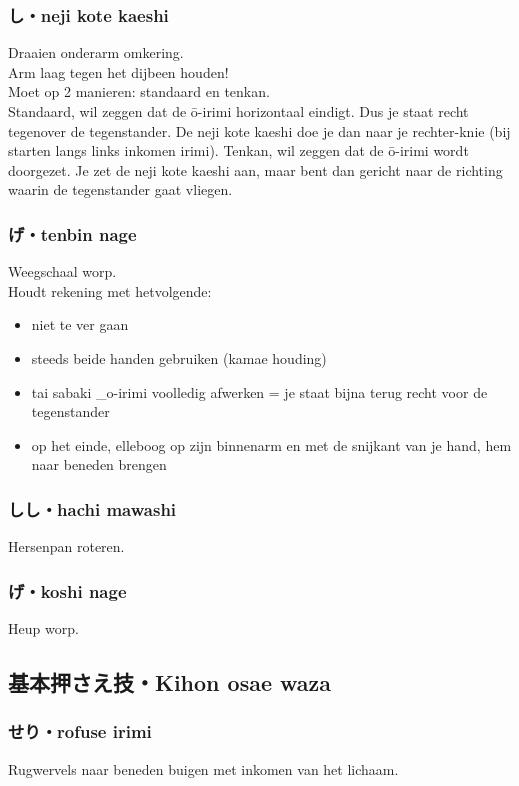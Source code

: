 \subsubsection{し・neji kote kaeshi}
Draaien onderarm omkering.\\
Arm laag tegen het dijbeen houden!\\
Moet op 2 manieren: standaard en tenkan.\\
Standaard, wil zeggen dat de \={o}-irimi horizontaal eindigt. Dus je staat recht tegenover de tegenstander. De neji kote kaeshi doe je dan naar je rechter-knie (bij starten langs links inkomen irimi). 
Tenkan, wil zeggen dat de \={o}-irimi wordt doorgezet. Je zet de neji kote kaeshi aan, maar bent dan gericht naar de richting waarin de tegenstander gaat vliegen.

\subsubsection{げ・tenbin nage}
Weegschaal worp.\\
Houdt rekening met hetvolgende:
\begin{itemize}
    \item niet te ver gaan
    \item steeds beide handen gebruiken (kamae houding)
    \item tai sabaki \_{o}-irimi voolledig afwerken = je staat bijna terug recht voor de tegenstander
    \item op het einde, elleboog op zijn binnenarm en met de snijkant van je hand, hem naar beneden brengen
\end{itemize}

\subsubsection{しし・hachi mawashi}
Hersenpan roteren.

\subsubsection{げ・koshi nage}
Heup worp.

\subsection{基本押さえ技・Kihon osae waza}
\subsubsection{せり・rofuse irimi}
Rugwervels naar beneden buigen met inkomen van het lichaam.

